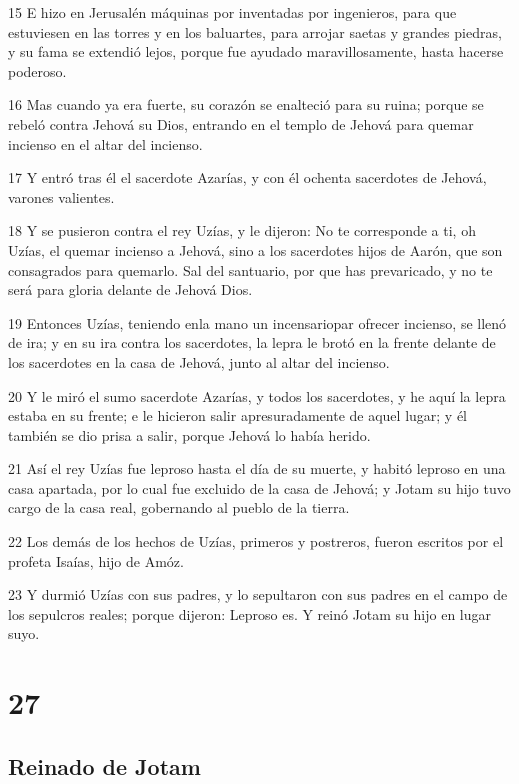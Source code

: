\par 15 E hizo en Jerusalén  máquinas por inventadas por ingenieros, para que estuviesen en las torres y en los baluartes, para arrojar saetas y grandes piedras, y su fama se extendió lejos, porque fue ayudado maravillosamente, hasta hacerse poderoso.
\par 16 Mas cuando ya era fuerte, su corazón se enalteció para su ruina; porque se rebeló contra Jehová su Dios, entrando en el templo de Jehová para quemar incienso en el altar del incienso.
\par 17 Y entró tras él el sacerdote Azarías, y con él ochenta sacerdotes de Jehová, varones valientes.
\par 18 Y se pusieron contra el rey Uzías, y le dijeron: No te corresponde a ti, oh Uzías, el quemar incienso a Jehová, sino a los sacerdotes hijos de Aarón, que son consagrados para quemarlo. Sal del santuario, por que has prevaricado, y no te será para gloria delante de Jehová Dios.
\par 19 Entonces Uzías, teniendo enla mano un incensariopar ofrecer incienso, se llenó de ira; y en su ira contra los sacerdotes, la lepra le brotó en la frente delante de los sacerdotes en la casa de Jehová, junto al altar del incienso.
\par 20 Y le miró el sumo sacerdote Azarías, y todos los sacerdotes, y he aquí la lepra estaba en su frente; e le hicieron salir apresuradamente de aquel lugar; y él también se dio prisa a salir, porque Jehová lo había herido.
\par 21 Así el rey Uzías fue leproso hasta el día de su muerte, y habitó leproso en una casa apartada, por lo cual fue excluido de la casa de Jehová; y Jotam su hijo tuvo cargo de la casa real, gobernando al pueblo de la tierra.
\par 22 Los demás de los hechos de Uzías, primeros y postreros, fueron escritos por el profeta Isaías, hijo de Amóz.
\par 23 Y durmió Uzías con sus padres, y lo sepultaron con sus padres en el campo de los sepulcros reales; porque dijeron: Leproso es. Y reinó Jotam su hijo en lugar suyo.

\chapter{27}

\section*{Reinado de Jotam}

